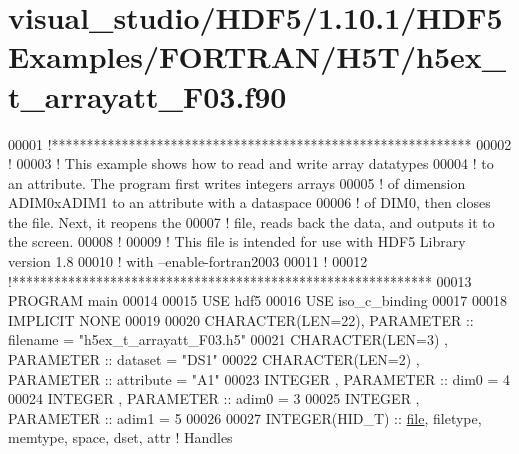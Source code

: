 \hypertarget{visual__studio_2_h_d_f5_21_810_81_2_h_d_f5_examples_2_f_o_r_t_r_a_n_2_h5_t_2h5ex__t__arrayatt___f03_8f90_source}{}\section{visual\+\_\+studio/\+H\+D\+F5/1.10.1/\+H\+D\+F5\+Examples/\+F\+O\+R\+T\+R\+A\+N/\+H5\+T/h5ex\+\_\+t\+\_\+arrayatt\+\_\+\+F03.f90}
\label{visual__studio_2_h_d_f5_21_810_81_2_h_d_f5_examples_2_f_o_r_t_r_a_n_2_h5_t_2h5ex__t__arrayatt___f03_8f90_source}

\begin{DoxyCode}
00001 \textcolor{comment}{!************************************************************}
00002 \textcolor{comment}{!}
00003 \textcolor{comment}{!  This example shows how to read and write array datatypes}
00004 \textcolor{comment}{!  to an attribute.  The program first writes integers arrays}
00005 \textcolor{comment}{!  of dimension ADIM0xADIM1 to an attribute with a dataspace}
00006 \textcolor{comment}{!  of DIM0, then closes the  file.  Next, it reopens the}
00007 \textcolor{comment}{!  file, reads back the data, and outputs it to the screen.}
00008 \textcolor{comment}{!}
00009 \textcolor{comment}{!  This file is intended for use with HDF5 Library version 1.8}
00010 \textcolor{comment}{!  with --enable-fortran2003 }
00011 \textcolor{comment}{!}
00012 \textcolor{comment}{!************************************************************}
00013 \textcolor{keyword}{PROGRAM} main
00014 
00015   \textcolor{keywordtype}{USE }hdf5
00016   \textcolor{keywordtype}{USE }iso\_c\_binding
00017   
00018   \textcolor{keywordtype}{IMPLICIT NONE}
00019 
00020   \textcolor{keywordtype}{CHARACTER(LEN=22)}, \textcolor{keywordtype}{PARAMETER} :: filename  = \textcolor{stringliteral}{"h5ex\_t\_arrayatt\_F03.h5"}
00021   \textcolor{keywordtype}{CHARACTER(LEN=3)} , \textcolor{keywordtype}{PARAMETER} :: dataset   = \textcolor{stringliteral}{"DS1"}
00022   \textcolor{keywordtype}{CHARACTER(LEN=2)} , \textcolor{keywordtype}{PARAMETER} :: attribute = \textcolor{stringliteral}{"A1"}
00023   \textcolor{keywordtype}{INTEGER}          , \textcolor{keywordtype}{PARAMETER} :: dim0      = 4
00024   \textcolor{keywordtype}{INTEGER}          , \textcolor{keywordtype}{PARAMETER} :: adim0     = 3
00025   \textcolor{keywordtype}{INTEGER}          , \textcolor{keywordtype}{PARAMETER} :: adim1     = 5
00026 
00027   \textcolor{keywordtype}{INTEGER(HID\_T)}  :: \hyperlink{structfile}{file}, filetype, memtype, space, dset, attr \textcolor{comment}{! Handles}

\end{DoxyCode}
